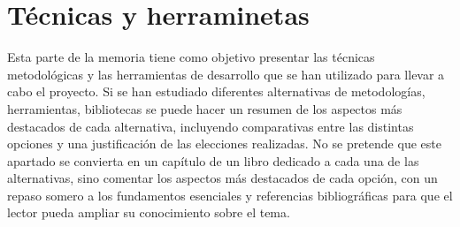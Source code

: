 \chapter{Técnicas y herraminetas} %
\label{cha:Técnicas y herraminetas}

Esta parte de la memoria tiene como objetivo presentar las técnicas
metodológicas y las herramientas de desarrollo que se han utilizado para llevar
a cabo el proyecto. Si se han estudiado diferentes alternativas de
metodologías, herramientas, bibliotecas se puede hacer un resumen de los
aspectos más destacados de cada alternativa, incluyendo comparativas entre las
distintas opciones y una justificación de las elecciones realizadas. No se
pretende que este apartado se convierta en un capítulo de un libro dedicado a
cada una de las alternativas, sino comentar los aspectos más destacados de cada
opción, con un repaso somero a los fundamentos esenciales y referencias
bibliográficas para que el lector pueda ampliar su conocimiento sobre el tema.

